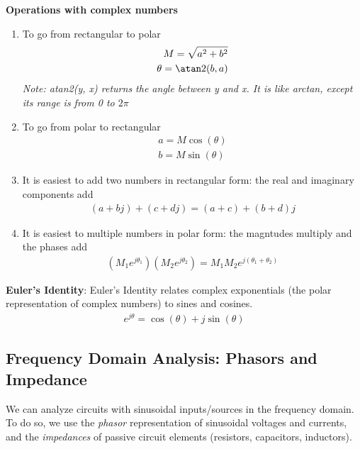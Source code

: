 \textbf{Operations with complex numbers}
\begin{enumerate}
    \item To go from rectangular to polar
    \begin{align*}
        M = \sqrt{a^2 + b^2} \\
        \theta = \atan2(b, a)
    \end{align*}
    \textit{Note: atan2(y, x) returns the angle between y and x. It is like arctan, except its range is from 0 to $2\pi$}
    \item To go from polar to rectangular
    \begin{align*}
        a = M\cos(\theta) \\
        b = M\sin(\theta)
    \end{align*}

    \item It is easiest to add two numbers in rectangular form: the real and imaginary components add
    \begin{align*}
        (a + bj) + (c + dj) = (a + c) + (b + d)j
    \end{align*}

    \item It is easiest to multiple numbers in polar form: the magntudes multiply and the phases add
    \begin{align*}
        (M_1 e^{j \theta_1})(M_2 e^{j \theta_2}) = M_1 M_2 e^{j (\theta_1 + \theta_2)}
    \end{align*}
\end{enumerate}

\textbf{Euler's Identity}: Euler's Identity relates complex exponentials (the polar representation of complex numbers) to sines and cosines.
\begin{align*}
    e^{j \theta} = \cos(\theta) + j \sin(\theta)
\end{align*}

\subsection*{Frequency Domain Analysis: Phasors and Impedance}
We can analyze circuits with sinusoidal inputs/sources in the frequency domain. To do so, we use the \textit{phasor} representation of sinusoidal voltages and currents, and the \textit{impedances} of passive circuit elements (resistors, capacitors, inductors).

